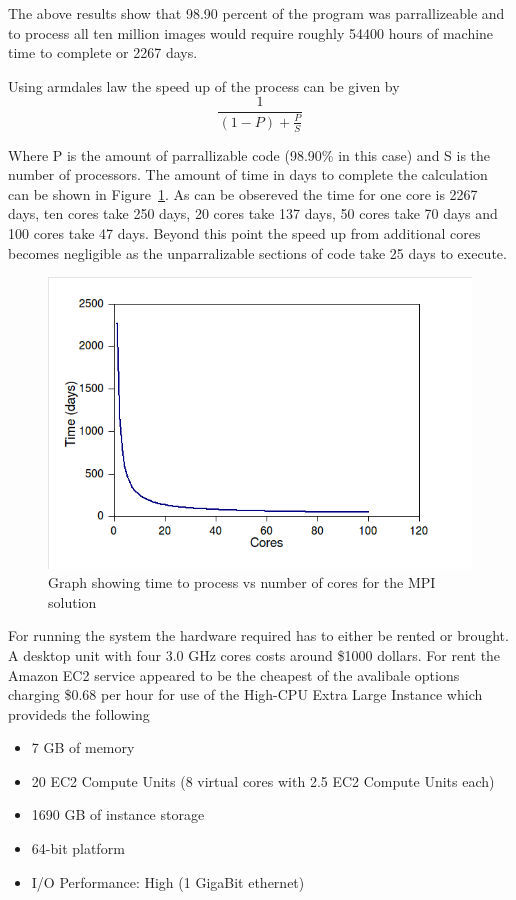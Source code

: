 The above results show that 98.90 percent of the program was parrallizeable and to process all ten million images would require roughly 54400 hours of machine time to complete or 2267 days.

Using armdales law the speed up of the process can be given by
\[
 \frac{1}{(1-P) + \frac{P}{S}}
\]

Where P is the amount of parrallizable code (98.90\% in this case) and S is the number of processors. The amount of time in days to complete the calculation can be shown in Figure~\ref{mpi-time-cores}. As can be obsereved the time for one core is 2267 days, ten cores take 250 days, 20 cores take 137 days, 50 cores take 70 days and 100 cores take 47 days. Beyond this point the speed up from additional cores becomes negligible as the unparralizable sections of code take 25 days to execute. 

\begin{figure}[ht]
	\begin{center}
		\includegraphics[width=1.0\textwidth]{mpi-time-cores}
	\end{center}
	\caption{Graph showing time to process vs number of cores for the MPI solution}
	\label{mpi-time-cores}
\end{figure}

For running the system the hardware required has to either be rented or brought. A desktop unit with four 3.0 GHz cores costs around \$1000 dollars. For rent the Amazon EC2 service appeared to be the cheapest of the avalibale options charging \$0.68 per hour for use of the High-CPU Extra Large Instance which provideds the following 

\begin{itemize}
\item 7 GB of memory
\item 20 EC2 Compute Units (8 virtual cores with 2.5 EC2 Compute Units each)
\item 1690 GB of instance storage
\item 64-bit platform
\item I/O Performance: High (1 GigaBit ethernet)
\end{itemize}

